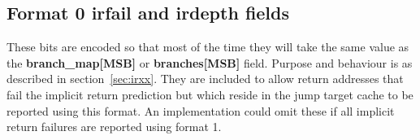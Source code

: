 \subsection{Format 0 \textbf{irfail} and \textbf{irdepth} fields}
These bits are encoded so that most of the time they will take the same value as the \textbf{branch\_map[MSB]} 
or \textbf{branches[MSB]} field.  Purpose and behaviour is as described in section~\ref{sec:irxx}.
They are included to allow return addresses that fail the implicit return prediction but 
which reside in the jump target cache to be reported using this format.  An implementation
could omit these if all implicit return failures are reported using format 1.





